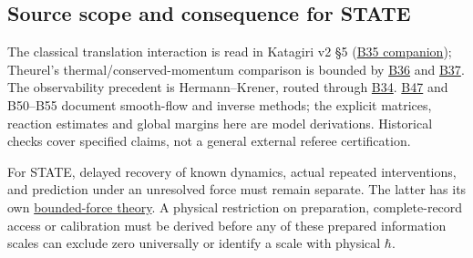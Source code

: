 \documentclass[11pt,a4paper]{article}
\begin{document}
\hypertarget{source-scope-and-consequence-for-state}{%
\subsection{Source scope and consequence for
STATE}\label{source-scope-and-consequence-for-state}}

The classical translation interaction is read in Katagiri v2 §5
(\href{../docs/batches/B35/readout-source-companion.md}{B35 companion});
Theurel's thermal/conserved-momentum comparison is bounded by
\href{../references/batches/B36.md}{B36} and
\href{../references/batches/B37.md}{B37}. The observability precedent is
Hermann--Krener, routed through
\href{../docs/batches/B34/receiver-memory-source-companion.md}{B34}.
\href{../references/batches/B47.md}{B47} and B50--B55 document
smooth-flow and inverse methods; the explicit matrices, reaction
estimates and global margins here are model derivations. Historical
checks cover specified claims, not a general external referee
certification.

For STATE, delayed recovery of known dynamics, actual repeated
interventions, and prediction under an unresolved force must remain
separate. The latter has its own
\href{causal-force-information.md}{bounded-force theory}. A physical
restriction on preparation, complete-record access or calibration must
be derived before any of these prepared information scales can exclude
zero universally or identify a scale with physical \(\hbar\).
\end{document}
